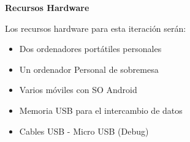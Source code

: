 \documentclass[../pfc.tex]{subfiles}
\begin{document}
	\textbf{Recursos Hardware}
	
	Los recursos hardware para esta iteración serán:
	
	\begin{itemize}
		\item Dos ordenadores portátiles personales
		\item Un ordenador Personal de sobremesa
		\item Varios móviles con SO Android
		\item Memoria USB para el intercambio de datos
		\item Cables USB - Micro USB (Debug)
	\end{itemize}	
	
\end{document}
